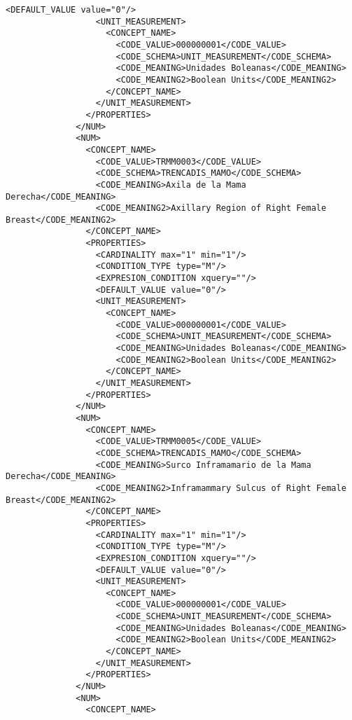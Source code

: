 \begin{lstlisting}[label=dicom-report,caption=Informe estructurado de una exploración de mama]
                  <DEFAULT_VALUE value="0"/>
                  <UNIT_MEASUREMENT>
                    <CONCEPT_NAME>
                      <CODE_VALUE>000000001</CODE_VALUE>
                      <CODE_SCHEMA>UNIT_MEASUREMENT</CODE_SCHEMA>
                      <CODE_MEANING>Unidades Boleanas</CODE_MEANING>
                      <CODE_MEANING2>Boolean Units</CODE_MEANING2>
                    </CONCEPT_NAME>
                  </UNIT_MEASUREMENT>
                </PROPERTIES>
              </NUM>
              <NUM>
                <CONCEPT_NAME>
                  <CODE_VALUE>TRMM0003</CODE_VALUE>
                  <CODE_SCHEMA>TRENCADIS_MAMO</CODE_SCHEMA>
                  <CODE_MEANING>Axila de la Mama Derecha</CODE_MEANING>
                  <CODE_MEANING2>Axillary Region of Right Female Breast</CODE_MEANING2>
                </CONCEPT_NAME>
                <PROPERTIES>
                  <CARDINALITY max="1" min="1"/>
                  <CONDITION_TYPE type="M"/>
                  <EXPRESION_CONDITION xquery=""/>
                  <DEFAULT_VALUE value="0"/>
                  <UNIT_MEASUREMENT>
                    <CONCEPT_NAME>
                      <CODE_VALUE>000000001</CODE_VALUE>
                      <CODE_SCHEMA>UNIT_MEASUREMENT</CODE_SCHEMA>
                      <CODE_MEANING>Unidades Boleanas</CODE_MEANING>
                      <CODE_MEANING2>Boolean Units</CODE_MEANING2>
                    </CONCEPT_NAME>
                  </UNIT_MEASUREMENT>
                </PROPERTIES>
              </NUM>
              <NUM>
                <CONCEPT_NAME>
                  <CODE_VALUE>TRMM0005</CODE_VALUE>
                  <CODE_SCHEMA>TRENCADIS_MAMO</CODE_SCHEMA>
                  <CODE_MEANING>Surco Inframamario de la Mama Derecha</CODE_MEANING>
                  <CODE_MEANING2>Inframammary Sulcus of Right Female Breast</CODE_MEANING2>
                </CONCEPT_NAME>
                <PROPERTIES>
                  <CARDINALITY max="1" min="1"/>
                  <CONDITION_TYPE type="M"/>
                  <EXPRESION_CONDITION xquery=""/>
                  <DEFAULT_VALUE value="0"/>
                  <UNIT_MEASUREMENT>
                    <CONCEPT_NAME>
                      <CODE_VALUE>000000001</CODE_VALUE>
                      <CODE_SCHEMA>UNIT_MEASUREMENT</CODE_SCHEMA>
                      <CODE_MEANING>Unidades Boleanas</CODE_MEANING>
                      <CODE_MEANING2>Boolean Units</CODE_MEANING2>
                    </CONCEPT_NAME>
                  </UNIT_MEASUREMENT>
                </PROPERTIES>
              </NUM>
              <NUM>
                <CONCEPT_NAME>

\end{lstlisting}
